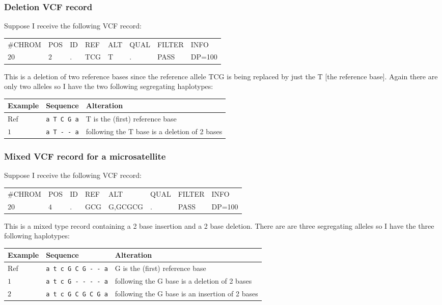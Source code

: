 \documentclass[8pt]{article}
\begin{document}
\subsubsection{Deletion VCF record}
Suppose I receive the following VCF record:

\vspace{0.3cm}
\begin{tabular}{ l l l l l l l l}
	\#CHROM & POS & ID & REF & ALT & QUAL & FILTER & INFO \\
	$20$ & $2$ & . & TCG & T & . & PASS & DP=100 \\
\end{tabular}
\vspace{0.3cm}

This is a deletion of two reference bases since the reference allele TCG is being replaced by just the T [the reference base]. Again there are only two alleles so I have the two following segregating haplotypes:

\vspace{0.3cm}
\begin{tabular}{ | l | l | l | }
\hline
Example & Sequence & Alteration \\ \hline
Ref & \verb|a T C G a| & T is the (first) reference base \\ \hline
$1$ & \verb|a T - - a| & following the T base is a deletion of 2 bases \\ \hline
\end{tabular}

\subsubsection{Mixed VCF record for a microsatellite}
Suppose I receive the following VCF record:

\vspace{0.3cm}
\begin{tabular}{ l l l l l l l l}
	\#CHROM & POS & ID & REF & ALT & QUAL & FILTER & INFO \\
	$20$ & $4$ & . & GCG & G,GCGCG & . & PASS & DP=100 \\
\end{tabular}
\vspace{0.3cm}

This is a mixed type record containing a 2 base insertion and a 2 base deletion. There are are three segregating alleles so I have the three following haplotypes:

\vspace{0.3cm}
\begin{tabular}{ | l | l | l | }
\hline
Example & Sequence & Alteration \\ \hline
Ref & \verb|a t c G C G - - a| & G is the (first) reference base \\ \hline
$1$ & \verb|a t c G - - - - a| & following the G base is a deletion of 2 bases \\ \hline
$2$ & \verb|a t c G C G C G a| & following the G base is an insertion of 2 bases \\ \hline
\end{tabular}
\vspace{0.3cm}
\end{document}
